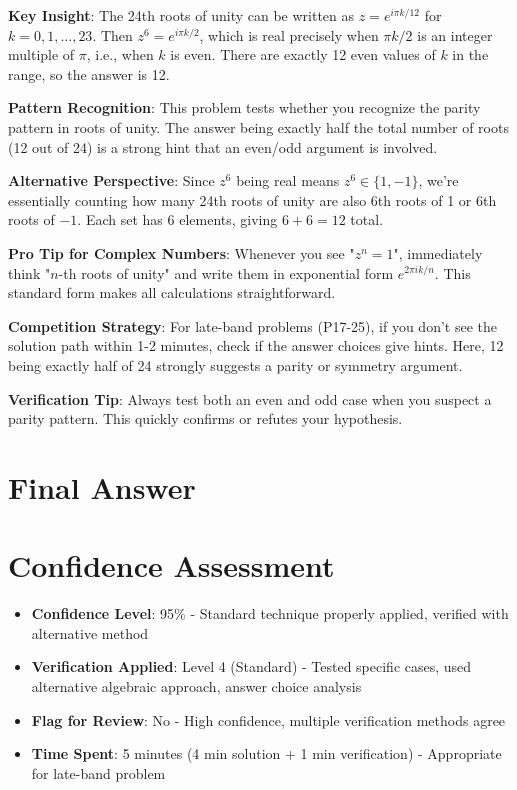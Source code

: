 \documentclass[]{article}
\begin{document}
\begin{keyinsightbox}
\textbf{Key Insight}: The 24th roots of unity can be written as $z = e^{i\pi k/12}$ for $k = 0, 1, \ldots, 23$. Then $z^6 = e^{i\pi k/2}$, which is real precisely when $\pi k/2$ is an integer multiple of $\pi$, i.e., when $k$ is even. There are exactly 12 even values of $k$ in the range, so the answer is 12.

\textbf{Pattern Recognition}: This problem tests whether you recognize the parity pattern in roots of unity. The answer being exactly half the total number of roots (12 out of 24) is a strong hint that an even/odd argument is involved.

\textbf{Alternative Perspective}: Since $z^6$ being real means $z^6 \in \{1, -1\}$, we're essentially counting how many 24th roots of unity are also 6th roots of 1 or 6th roots of $-1$. Each set has 6 elements, giving $6 + 6 = 12$ total.
\end{keyinsightbox}

\begin{tipbox}
\textbf{Pro Tip for Complex Numbers}: Whenever you see "$z^n = 1$", immediately think "$n$-th roots of unity" and write them in exponential form $e^{2\pi i k/n}$. This standard form makes all calculations straightforward.

\textbf{Competition Strategy}: For late-band problems (P17-25), if you don't see the solution path within 1-2 minutes, check if the answer choices give hints. Here, 12 being exactly half of 24 strongly suggests a parity or symmetry argument.

\textbf{Verification Tip}: Always test both an even and odd case when you suspect a parity pattern. This quickly confirms or refutes your hypothesis.
\end{tipbox}

\section*{Final Answer}

\section*{Confidence Assessment}
\begin{itemize}[leftmargin=*]
    \item \textbf{Confidence Level}: 95\% - Standard technique properly applied, verified with alternative method
    \item \textbf{Verification Applied}: Level 4 (Standard) - Tested specific cases, used alternative algebraic approach, answer choice analysis
    \item \textbf{Flag for Review}: No - High confidence, multiple verification methods agree
    \item \textbf{Time Spent}: 5 minutes (4 min solution + 1 min verification) - Appropriate for late-band problem
\end{itemize}
\end{document}
